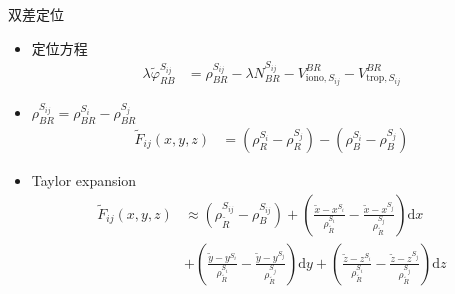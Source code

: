 \begin{frame}{双差定位}
    \begin{itemize}
        \item 定位方程
        \begin{align*}
            \lambda \tilde \varphi _ { RB } ^ { S _ { ij } } &= \rho _ { BR } ^ { S _ { ij } }
            - \lambda N _ { BR } ^ { S _ { ij } } - V _ { \mathrm{ iono }, S _ { ij } } ^ { BR } - V _ { \mathrm{ trop }, S _ { ij } } ^ { BR }
        \end{align*}
        \item $\rho _ { BR } ^ { S _ { ij } } = \rho _ { BR } ^ { S _ i } - \rho _ { BR } ^ { S _ j }$
        \begin{align*}
            \tilde F _ { ij } \left( x, y, z \right) &= \left( \rho _ R ^ { S _ i } - \rho _ R ^ { S _ j } \right) 
            - \left( \rho _ B ^ { S _ i } - \rho _ B ^ { S _ j } \right)
        \end{align*}
        \item Taylor expansion
        \begin{align*}
            \tilde F _ { ij } \left( x, y, z \right) &\approx \left( \rho _ { \tilde R } ^ { S _ { ij } } - \rho _ B ^ { S _ { ij } } \right)
            + \left( \frac{ \tilde x - x ^ { S _ i } }{ \rho _ { \tilde R } ^ { S _ i } }
            - \frac{ \tilde x - x ^ { S _ j } }{ \rho _ { \tilde R } ^ { S _ j } } \right) \mathrm d x \\
            &+ \left( \frac{ \tilde y - y ^ { S _ i } }{ \rho _ { \tilde R } ^ { S _ i } }
            - \frac{ \tilde y - y ^ { S _ j } }{ \rho _ { \tilde R } ^ { S _ j } } \right) \mathrm d y
            + \left( \frac{ \tilde z - z ^ { S _ i } }{ \rho _ { \tilde R } ^ { S _ i } }
            - \frac{ \tilde z - z ^ { S _ j } }{ \rho _ { \tilde R } ^ { S _ j } } \right) \mathrm d z
        \end{align*}
    \end{itemize}
\end{frame}

